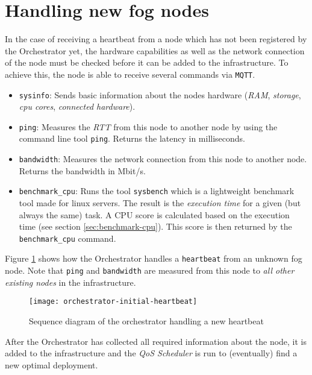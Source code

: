 \section{Handling new fog nodes\label{sec:handling-new-fog-nodes}}

In the case of receiving a heartbeat from a node which has not been registered by the Orchestrator yet, the hardware capabilities as well as the network connection of the node must be checked before it can be added to the infrastructure. To achieve this, the node is able to receive several commands via \texttt{MQTT}.

\begin{itemize}
    \item \texttt{sysinfo}: Sends basic information about the nodes hardware (\textit{RAM}, \textit{storage}, \textit{cpu cores}, \textit{connected hardware}).
    \item \texttt{ping}: Measures the \textit{RTT} from this node to another node by using the command line tool \texttt{ping}. Returns the latency in milliseconds.
    \item \texttt{bandwidth}: Measures the network connection from this node to another node. Returns the bandwidth in Mbit/s.
    \item \texttt{benchmark\_cpu}: Runs the tool \texttt{sysbench} which is a lightweight benchmark tool made for linux servers. The result is the \textit{execution time} for a given (but always the same) task. A CPU score is calculated based on the execution time (see section \ref{sec:benchmark-cpu}). This score is then returned by the \texttt{benchmark\_cpu} command.
\end{itemize}

Figure \ref{fig:orchestrator-initial-heartbeat} shows how the Orchestrator handles a \texttt{heartbeat} from an unknown fog node. Note that \texttt{ping} and \texttt{bandwidth} are measured from this node to \textit{all other existing nodes} in the infrastructure.

\begin{figure}[htb]
    \centering
    \texttt{[image: orchestrator-initial-heartbeat]}
    \caption{Sequence diagram of the orchestrator handling a new heartbeat}
    \label{fig:orchestrator-initial-heartbeat}
\end{figure}

After the Orchestrator has collected all required information about the node, it is added to the infrastructure and the \textit{QoS Scheduler} is run to (eventually) find a new optimal deployment.


